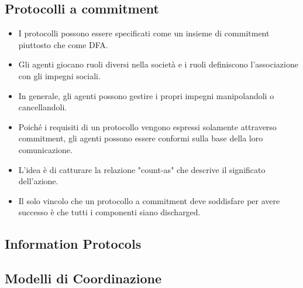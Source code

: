 \subsection{Protocolli a commitment}


\begin{itemize}
  \item I protocolli possono essere specificati come un insieme di commitment piuttosto che come DFA. 
  \item Gli agenti giocano ruoli diversi nella società e i ruoli definiscono l'associazione con gli impegni sociali. 
  \item In generale, gli agenti possono gestire i propri impegni manipolandoli o cancellandoli. 
  \item Poiché i requisiti di un protocollo vengono espressi solamente attraverso commitment, gli agenti possono essere conformi sulla base della loro comunicazione. 
 \item L'idea è di catturare la relazione "count-as" che descrive il significato dell'azione. 
    \item Il solo vincolo che un protocollo a commitment deve soddisfare per avere successo è che tutti i componenti siano discharged. 

\end{itemize}



\subsection{Information Protocols}

\subsection{Modelli di Coordinazione}







